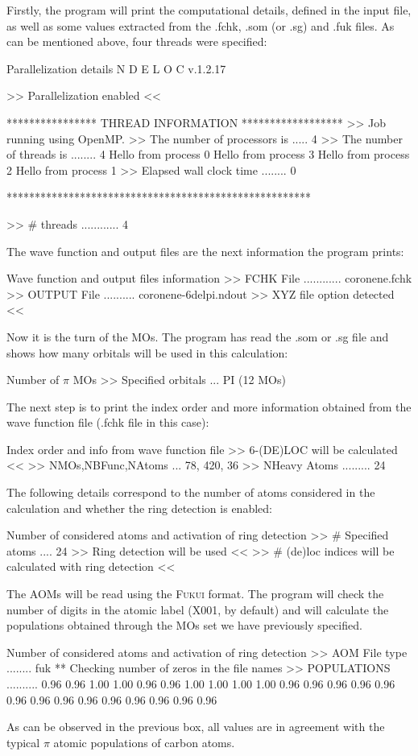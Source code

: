 \documentclass[a4paper,11pt,openany]{memoir}
\begin{document}
Firstly, the program will print the computational details, defined in the input file, as well as some values extracted from the .fchk, .som (or .sg) and .fuk files. As can be mentioned above, four threads were specified:
\begin{recuadro}{Parallelization details}
N D E L O C  v.1.2.17

>> Parallelization enabled <<

**************** THREAD INFORMATION ******************
>> Job running using OpenMP.
>> The number of processors is .....   4
>> The number of threads is ........   4
Hello from process       0
Hello from process       3
Hello from process       2
Hello from process       1
>> Elapsed wall clock time ........          0

******************************************************

>> # threads ............ 4
\end{recuadro}
The wave function and output files are the next information the program prints:
\begin{recuadro}{Wave function and output files information}
>> FCHK File ............ coronene.fchk
>> OUTPUT File .......... coronene-6delpi.ndout
>> XYZ file option detected <<
\end{recuadro}
Now it is the turn of the \acp{MO}. The program has read the .som or .sg file and shows how many orbitals will be used in this calculation:
\begin{recuadro}{Number of $\pi$ \acp{MO}}
>> Specified orbitals ... PI (12 MOs)
\end{recuadro}
The next step is to print the index order and more information obtained from the wave function file (.fchk file in this case):
\begin{recuadro}{Index order and info from wave function file}
>> 6-(DE)LOC will be calculated <<
>> NMOs,NBFunc,NAtoms ... 78, 420, 36
>> NHeavy Atoms ......... 24
\end{recuadro}
The following details correspond to the number of atoms considered in the calculation and whether the ring detection is enabled:
\begin{recuadro}{Number of considered atoms and activation of ring detection}
>> # Specified atoms .... 24
>> Ring detection will be used <<
>> # (de)loc indices will be calculated with ring detection <<
\end{recuadro}
The \acfp{AOM} will be read using the \textsc{Fukui} format. The program will check the number of digits in the atomic label (X001, by default) and will calculate the populations obtained through the \acp{MO} set we have previously specified.
\begin{recuadro}{Number of considered atoms and activation of ring detection}
>> AOM File type ........ fuk
** Checking number of zeros in the file names
>> POPULATIONS .......... 0.96 0.96 1.00 1.00 0.96 0.96 1.00 1.00 1.00 1.00 0.96
                          0.96 0.96 0.96 0.96 0.96 0.96 0.96 0.96 0.96 0.96 0.96
                          0.96 0.96
\end{recuadro}
As can be observed in the previous box, all values are in agreement with the typical $\pi$ atomic populations of carbon atoms.
\end{document}
